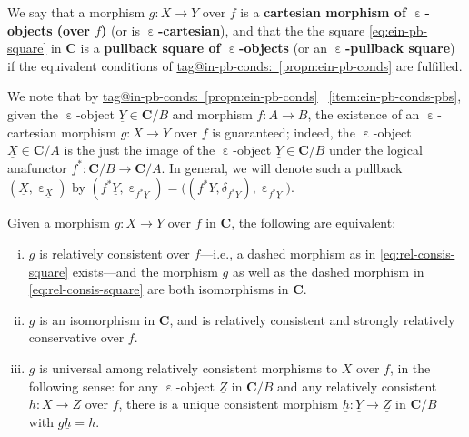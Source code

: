 \documentclass{amsart}
\makeatletter
\newcommand\bC{\mathbf{C}}
\newcommand\defword[1]{{\boldmath \textbf{#1}}}
\newcommand\ein{\mathrel{\varepsilon}}
\newcommand\pbig[1]{\big({#1}\big)}
\newcommand\und[1]{\underline{#1}}
\newcommand\unein{{\ein}}
\newcommand\prooflabel[1]{\gdef\proof@label{#1}}
\def\proof@label{}
\newcommand\tagword[1]{\csname tag@#1\endcsname}
\def\label@tag#1:#2\@nil{#1}
\newcommand\labeltag[1]{\label@tag#1:\@nil}
\newcommand\jref[1]{%
  \texorpdfstring%
    {\hyperref[#1]{\tagword{\labeltag{#1}}~\ref*{#1}}}%
    {\tagword{\labeltag{#1}}~\ref*{#1}}%
}
\theoremstyle{definition}
\theoremstyle{remark}
\theoremstyle{plainwithref}
\makeatother
\begin{document}
\begin{defn} \label{defn:ein-cartesian}
  We say that a morphism \( g \colon X \to Y \) over \( f \) is a \defword{cartesian morphism of \( \unein \)-objects (over \( f \))} (or is \defword{\( \unein \)-cartesian}), and that the the square \eqref{eq:ein-pb-square} in \( \bC \) is a \defword{pullback square of \( \unein \)-objects} (or an \defword{\( \unein \)-pullback square}) if the equivalent conditions of \jref{propn:ein-pb-conds} are fulfilled.

  We note that by \jref{propn:ein-pb-conds}~\ref{item:ein-pb-conds-pbs}, given the \( \unein \)-object \( \und Y \in \bC / B \) and morphism \( f \colon A \to B \), the existence of an \( \unein \)-cartesian morphism \( g \colon X \to Y \) over \( f \) is guaranteed; indeed, the \( \unein \)-object \( \und X \in \bC / A \) is the just the image of the \( \unein \)-object \( \und Y \in \bC / B \) under the logical anafunctor \( f^* \colon \bC / B \to \bC / A \).
  In general, we will denote such a pullback \( (\und X, \ein_{\und X}) \) by \( (f^* \und Y, \ein_{f^* \und Y}) = \pbig{(f^* Y, \delta_{f^* Y}), \ein_{f^* \und Y}} \).
\end{defn}

\prooflabel{proof:ein-cocart-conds}
\begin{propn} \label{propn:ein-cocart-conds}
  Given a morphism \( g \colon X \to Y \) over \( f \) in \( \bC \), the following are equivalent:
  \begin{enumerate}[(i)]
  \item\label{item:ein-cocart-conds-iso} \( g \) is relatively consistent over \( f \)---i.e., a dashed morphism as in \eqref{eq:rel-consis-square} exists---and the morphism \( g \) as well as the dashed morphism in \eqref{eq:rel-consis-square} are both isomorphisms in \( \bC \).
  \item\label{item:ein-cocart-conds-strong} \( g \) is an isomorphism in \( \bC \), and is relatively consistent and strongly relatively conservative over \( f \).
  \item\label{item:ein-cocart-conds-univ} \( g \) is universal among relatively consistent morphisms to \( X \) over \( f \), in the following sense:
    for any \( \unein \)-object \( \und Z \) in \( \bC / B \) and any relatively consistent \( h \colon X \to Z \) over \( f \), there is a unique consistent morphism \( \und h \colon \und Y \to \und Z \) in \( \bC / B \) with \( g \und h = h \).
  \end{enumerate}
\end{propn}
\end{document}
